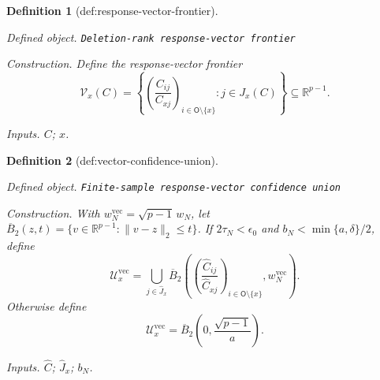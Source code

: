 \documentclass{article}
\newtheorem{definition}{Definition}
\begin{document}
\begin{definition}[def:response-vector-frontier]\label{def:response-vector-frontier}
\par\smallskip\noindent\emph{Defined object.} \texttt{Deletion-\allowbreak{}rank response-\allowbreak{}vector frontier}
\par\smallskip\noindent\emph{Construction.} Define the response-vector frontier
\[
 \mathcal V_x(C)
 =\left\{
 \left(\frac{C_{ij}}{C_{xj}}\right)_{i\in\mathsf O\setminus\{x\}}
 :j\in J_x(C)
 \right\}\subseteq\mathbb R^{p-1}.
\]
\par\smallskip\noindent\emph{Inputs.} \(C\); \(x\).
\end{definition}

\begin{definition}[def:vector-confidence-union]\label{def:vector-confidence-union}
\par\smallskip\noindent\emph{Defined object.} \texttt{Finite-\allowbreak{}sample response-\allowbreak{}vector confidence union}
\par\smallskip\noindent\emph{Construction.} With \(w_N^{\mathrm{vec}}=\sqrt{p-1}\,w_N\), let \(\overline B_2(z,t)=\{v\in\mathbb R^{p-1}:\lVert v-z\rVert_2\le t\}\). If \(2\tau_N<\epsilon_0\) and \(b_N<\min\{a,\delta\}/2\), define
\[
 \mathcal U_x^{\mathrm{vec}}
 =\bigcup_{j\in\widehat J_x}
 \overline B_2\!\left(
 \left(\frac{\widehat C_{ij}}{\widehat C_{xj}}\right)_{i\in\mathsf O\setminus\{x\}},
 w_N^{\mathrm{vec}}
 \right).
\]
Otherwise define
\[
 \mathcal U_x^{\mathrm{vec}}
 =\overline B_2\!\left(0,\frac{\sqrt{p-1}}a\right).
\]
\par\smallskip\noindent\emph{Inputs.} \(\widehat C\); \(\widehat J_x\); \(b_N\).
\end{definition}
\end{document}
